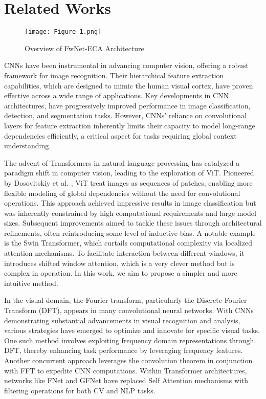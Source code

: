 \section{Related Works}
\begin{figure}[htbp]
    \centering
    \texttt{[image: Figure\_1.png]}
    \caption{Overview of FwNet-ECA Architecture}
    \label{fig:1}
\end{figure}

CNNs have been instrumental in advancing computer vision, offering a robust framework for image recognition\cite{lecun2015deep}. Their hierarchical feature extraction capabilities, which are designed to mimic the human visual cortex, have proven effective across a wide range of applications\cite{serre2007feedforward}. Key developments in CNN architectures\cite{krizhevsky2012imagenet}\cite{simonyan2014very}\cite{szegedy2015going}\cite{he-2016}, have progressively improved performance in image classification, detection, and segmentation tasks. However, CNNs' reliance on convolutional layers for feature extraction inherently limits their capacity to model long-range dependencies efficiently, a critical aspect for tasks requiring global context understanding\cite{long2015fully}. 

The advent of Transformers in natural language processing has catalyzed a paradigm shift in computer vision, leading to the exploration of ViT\cite{vaswani2017attention}. Pioneered by Dosovitskiy et al. \cite{dosovitskiy2020image}, ViT treat images as sequences of patches, enabling more flexible modeling of global dependencies without the need for convolutional operations. This approach achieved impressive results in image classification but was inherently  constrained by high computational requirements and large model sizes\cite{touvron2021training}. Subsequent improvements aimed to tackle these issues through architectural refinements, often reintroducing some level of inductive bias. A notable example is the Swin Transformer\cite{liu2021swin}, which curtails computational complexity via localized attention mechanisms. To facilitate interaction between different windows, it introduces shifted window attention, which is a very clever method but is complex in operation. In this work, we aim to propose a simpler and more intuitive method.

In the visual domain, the Fourier transform, particularly the Discrete Fourier Transform (DFT), appears in many convolutional neural networks. With CNNs demonstrating substantial advancements in visual recognition and analysis, various strategies have emerged to optimize and innovate for specific visual tasks. One such method involves exploiting frequency domain representations through DFT, thereby enhancing task performance by leveraging frequency features\cite{lee2018single}\cite{yang2020fda}. Another concurrent approach leverages the convolution theorem in conjunction with FFT to expedite CNN computations\cite{li2020falcon}. Within Transformer architectures, networks like FNet\cite{lee2021fnet} and GFNet\cite{rao2021global} have replaced Self Attention mechanisms with filtering operations for both CV and NLP tasks.


